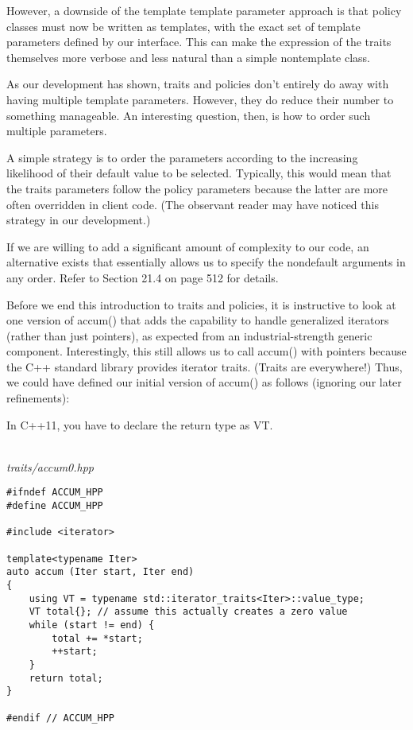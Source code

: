 However, a downside of the template template parameter approach is that policy classes must now be written as templates, with the exact set of template parameters defined by our interface. This can make the expression of the traits themselves more verbose and less natural than a simple nontemplate class.


As our development has shown, traits and policies don’t entirely do away with having multiple template parameters. However, they do reduce their number to something manageable. An interesting question, then, is how to order such multiple parameters.

A simple strategy is to order the parameters according to the increasing likelihood of their default value to be selected. Typically, this would mean that the traits parameters follow the policy parameters because the latter are more often overridden in client code. (The observant reader may have noticed this strategy in our development.) 

If we are willing to add a significant amount of complexity to our code, an alternative exists that essentially allows us to specify the nondefault arguments in any order. Refer to Section 21.4 on page 512 for details.


Before we end this introduction to traits and policies, it is   instructive to look at one version of accum() that adds the capability to handle generalized iterators (rather than just pointers), as expected from an industrial-strength generic component. Interestingly, this still allows us to call accum() with pointers because the C++ standard library provides iterator traits. (Traits are everywhere!) Thus, we could have defined our initial version of accum() as follows (ignoring our later refinements):

\begin{tcolorbox}[colback=webgreen!5!white,colframe=webgreen!75!black]
\hspace*{0.75cm}In C++11, you have to declare the return type as VT.
\end{tcolorbox}

\hspace*{\fill} \\ %
\noindent
\textit{traits/accum0.hpp}
\begin{lstlisting}[style=styleCXX]
#ifndef ACCUM_HPP
#define ACCUM_HPP

#include <iterator>

template<typename Iter>
auto accum (Iter start, Iter end)
{
	using VT = typename std::iterator_traits<Iter>::value_type;
	VT total{}; // assume this actually creates a zero value
	while (start != end) {
		total += *start;
		++start;
	}
	return total;
}

#endif // ACCUM_HPP
\end{lstlisting}

